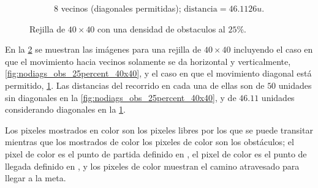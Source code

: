 \begin{enumerate}
\begin{solution}
\begin{figure}[ht!]
\begin{subfigure}{0.4\textwidth}
                \caption{8 vecinos (diagonales permitidas); $\text{distancia} = 46.1126 u$.}
                \label{fig:diags_obs_25percent_40x40}
            \end{subfigure}
            \caption{Rejilla de $40 \times 40$ con una densidad de obstaculos al $25\%$.}
            \label{fig:rejilla_40x40}
        \end{figure}

        En la \cref{fig:rejilla_40x40} se muestran las imágenes para una rejilla de $40 \times 40$ incluyendo el caso en que el movimiento hacia vecinos solamente se da horizontal y verticalmente, \cref{fig:nodiags_obs_25percent_40x40}, y el caso en que el movimiento diagonal está permitido, \cref{fig:diags_obs_25percent_40x40}. Las distancias del recorrido en cada una de ellas son de $50$ unidades sin diagonales en la \cref{fig:nodiags_obs_25percent_40x40}, y de $46.11$ unidades considerando diagonales en la \cref{fig:diags_obs_25percent_40x40}.

        Los pixeles mostrados en color  son los pixeles libres por los que se puede transitar mientras que los mostrados de color los pixeles de color  son los obstáculos; el pixel de color  es el punto de partida definido en , el pixel de color  es el punto de llegada definido en , y los pixeles de color  muestran el camino atravesado para llegar a la meta.


\end{solution}
\end{enumerate}

